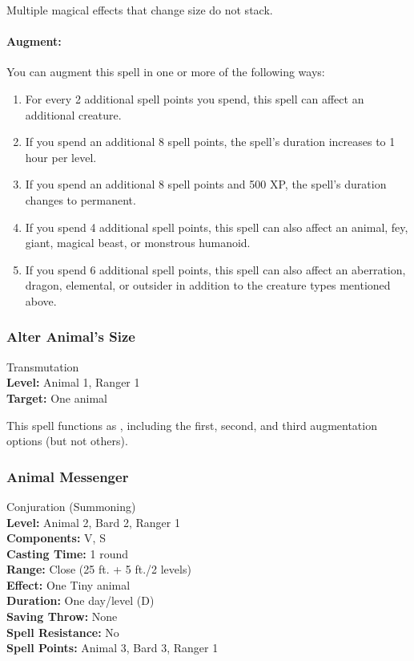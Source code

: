 Multiple magical effects that change size do not stack.

\paragraph{Augment:} You can augment this spell in one or more of the following ways:
\begin{enumerate}
 \item For every 2 additional spell points you spend, this spell can affect an additional creature.
 \item If you spend an additional 8 spell points, the spell's duration increases to 1 hour per level.
 \item If you spend an additional 8 spell points and 500 XP, the spell's duration changes to permanent.
 \item If you spend 4 additional spell points, 
 this spell can also affect an animal, fey, giant, magical beast, or monstrous humanoid.
 \item If you spend 6 additional spell points, 
 this spell can also affect an aberration, dragon, elemental, or outsider in addition to the creature types mentioned above.
\end{enumerate}
\subsubsection{Alter Animal's Size}
\label{Spell:AlterAnimalsSize}
Transmutation
\\ \textbf{Level:} Animal 1, Ranger 1
\\ \textbf{Target:} One animal

This spell functions as , including the first, second, and third augmentation options (but not others).

\subsubsection{Animal Messenger}
\label{Spell:AnimalMessenger}
Conjuration (Summoning)
\\ \textbf{Level:} Animal 2, Bard 2, Ranger 1
\\ \textbf{Components:} V, S
\\ \textbf{Casting Time:} 1 round
\\ \textbf{Range:} Close (25 ft. + 5 ft./2 levels)
\\ \textbf{Effect:} One Tiny animal
\\ \textbf{Duration:} One day/level (D)
\\ \textbf{Saving Throw:} None
\\ \textbf{Spell Resistance:} No
\\ \textbf{Spell Points:} Animal 3, Bard 3, Ranger 1

